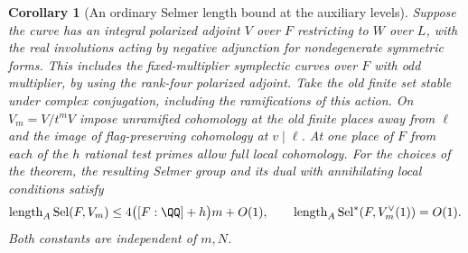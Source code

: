 \documentclass[a4paper,11pt]{article}
\newtheorem{corollary}[proposition]{Corollary}
\theoremstyle{definition}
\theoremstyle{remark}
\numberwithin{equation}{section}
\begin{document}
\begin{corollary}[An ordinary Selmer length bound at the auxiliary levels]
\leavevmode\label{cor:ordinarycurve598}
Suppose the curve has an integral polarized adjoint \(V\)
over \(F\) restricting to \(W\) over \(L\), with the real
involutions acting by negative adjunction for nondegenerate
symmetric forms. This includes the fixed-multiplier
symplectic curves over \(F\) with odd multiplier, by using
the rank-four polarized adjoint. Take the old finite set
stable under complex conjugation, including the
ramifications of this action. On \(V_m=V/t^mV\) impose
unramified cohomology at the old finite places away from
\(\ell\) and the image of flag-preserving cohomology
at \(v\mid\ell\). At one place of \(F\) from each of
the \(h\) rational test primes allow full local cohomology.
For the choices of the theorem, the resulting Selmer group
and its dual with annihilating local conditions satisfy
\[
  \operatorname{length}_A\operatorname{Sel}(F,V_m)
       \le 4\bigl([F:\QQ]+h\bigr)m+O(1),\qquad
  \operatorname{length}_A\operatorname{Sel}^*(F,V_m^\vee(1))
       =O(1).
\]
Both constants are independent of \(m,N\).
\end{corollary}
\end{document}

